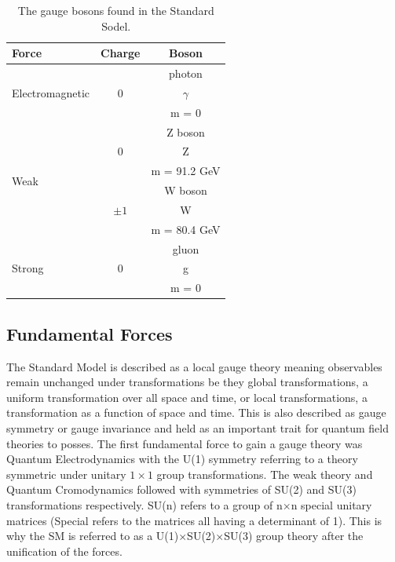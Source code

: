     \begin {table}[h]
      \begin{center}
      \begin{tabular}{|l|c|c|}
         \hline
         Force & Charge & Boson \\
         \hline
         \multirow{3}{*}{Electromagnetic} & \multirow{3}{*}{\Large 0} & photon \\
         & & {\Huge $\gamma$} \\
         & & m = 0 \\
         \hline
         \multirow{6}{*}{Weak} & \multirow{3}{*}{\Large 0} & Z boson \\
         & & {\Huge Z} \\
         & & m = 91.2 GeV \\
         \cline{2-3}
         & \multirow{3}{*}{\Large $\pm1$} & W boson \\
         & & {\Huge W} \\
         & & m = 80.4 GeV \\
         \hline
         \multirow{3}{*}{Strong} & \multirow{3}{*}{\Large 0} & gluon \\
         & & {\Huge g} \\
         & & m = 0 \\
         \hline
      \end{tabular}
      \caption{The gauge bosons found in the Standard Sodel.}
      \label{tab:bosons}
      \end{center}
    \end {table}



    \subsection{Fundamental Forces}
    The Standard Model is described as a local gauge theory meaning observables remain unchanged under transformations be they global transformations, a uniform transformation over all space and time, or local transformations, a transformation as a function of space and time. This is also described as gauge symmetry or gauge invariance and held as an important trait for quantum field theories to posses. The first fundamental force to gain a gauge theory was Quantum Electrodynamics with the U(1) symmetry referring to a theory symmetric under unitary $1\times1$ group transformations. The weak theory and Quantum Cromodynamics followed with symmetries of SU(2) and SU(3) transformations respectively. SU(n) refers to a group of n$\times$n special unitary matrices (Special refers to the matrices all having a determinant of 1). This is why the SM is referred to as a U(1)$\times$SU(2)$\times$SU(3) group theory after the unification of the forces.


